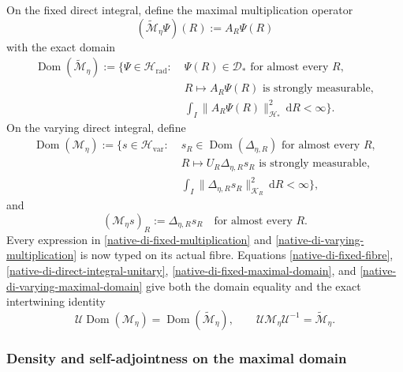 On the fixed direct integral, define the maximal multiplication operator
\begin{equation}
 (\widetilde{\mathscr M}_\eta\Psi)(R):=A_R\Psi(R)
\label{native-di-fixed-multiplication}
\end{equation}
with the exact domain
\begin{equation}
\begin{split}
 \operatorname{Dom}(\widetilde{\mathscr M}_\eta)
 :=\{\Psi\in\mathscr H_{\mathrm{rad}}:\;&
 \Psi(R)\in\mathscr D_*\text{ for almost every }R,\\
 &R\mapsto A_R\Psi(R)\text{ is strongly measurable},\\
 &\int_I\|A_R\Psi(R)\|_{\mathscr H_*}^2\,\mathrm d R<\infty\}.
\end{split}
\label{native-di-fixed-maximal-domain}
\end{equation}
On the varying direct integral, define
\begin{equation}
\begin{split}
 \operatorname{Dom}(\mathscr M_\eta)
 :=\{s\in\mathscr H_{\mathrm{var}}:\;&
 s_R\in\operatorname{Dom}(\Delta_{\eta,R})\text{ for almost every }R,\\
 &R\mapsto U_R\Delta_{\eta,R}s_R
       \text{ is strongly measurable},\\
 &\int_I\|\Delta_{\eta,R}s_R\|_{\mathscr K_R}^2\,\mathrm d R<\infty\},
\end{split}
\label{native-di-varying-maximal-domain}
\end{equation}
and
\begin{equation}
 (\mathscr M_\eta s)_R:=\Delta_{\eta,R}s_R
 \quad\text{for almost every }R.
\label{native-di-varying-multiplication}
\end{equation}
Every expression in \eqref{native-di-fixed-multiplication} and
\eqref{native-di-varying-multiplication} is now typed on its actual fibre.
Equations \eqref{native-di-fixed-fibre},
\eqref{native-di-direct-integral-unitary},
\eqref{native-di-fixed-maximal-domain}, and
\eqref{native-di-varying-maximal-domain} give both the domain equality and
the exact intertwining identity
\begin{equation}
 \mathscr U\operatorname{Dom}(\mathscr M_\eta)
 =\operatorname{Dom}(\widetilde{\mathscr M}_\eta),
 \qquad
 \mathscr U\mathscr M_\eta\mathscr U^{-1}
 =\widetilde{\mathscr M}_\eta.
\label{native-di-intertwining}
\end{equation}

\subsubsection{Density and self-adjointness on the maximal domain}

